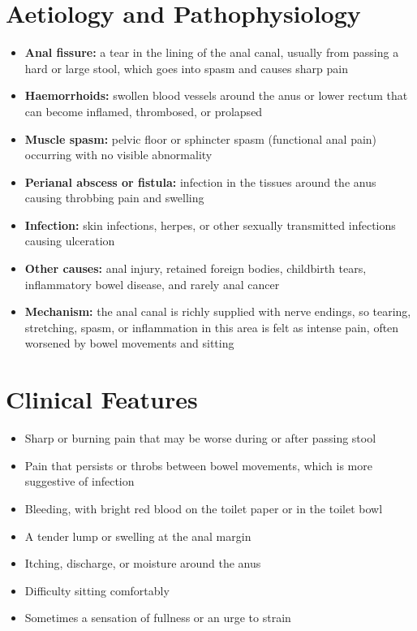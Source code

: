 \section*{Aetiology and Pathophysiology}
\begin{itemize}
    \item \textbf{Anal fissure:} a tear in the lining of the anal canal, usually from passing a hard or large stool, which goes into spasm and causes sharp pain
    \item \textbf{Haemorrhoids:} swollen blood vessels around the anus or lower rectum that can become inflamed, thrombosed, or prolapsed
    \item \textbf{Muscle spasm:} pelvic floor or sphincter spasm (functional anal pain) occurring with no visible abnormality
    \item \textbf{Perianal abscess or fistula:} infection in the tissues around the anus causing throbbing pain and swelling
    \item \textbf{Infection:} skin infections, herpes, or other sexually transmitted infections causing ulceration
    \item \textbf{Other causes:} anal injury, retained foreign bodies, childbirth tears, inflammatory bowel disease, and rarely anal cancer
    \item \textbf{Mechanism:} the anal canal is richly supplied with nerve endings, so tearing, stretching, spasm, or inflammation in this area is felt as intense pain, often worsened by bowel movements and sitting
\end{itemize}

\section*{Clinical Features}
\begin{itemize}
    \item Sharp or burning pain that may be worse during or after passing stool
    \item Pain that persists or throbs between bowel movements, which is more suggestive of infection
    \item Bleeding, with bright red blood on the toilet paper or in the toilet bowl
    \item A tender lump or swelling at the anal margin
    \item Itching, discharge, or moisture around the anus
    \item Difficulty sitting comfortably
    \item Sometimes a sensation of fullness or an urge to strain
\end{itemize}

